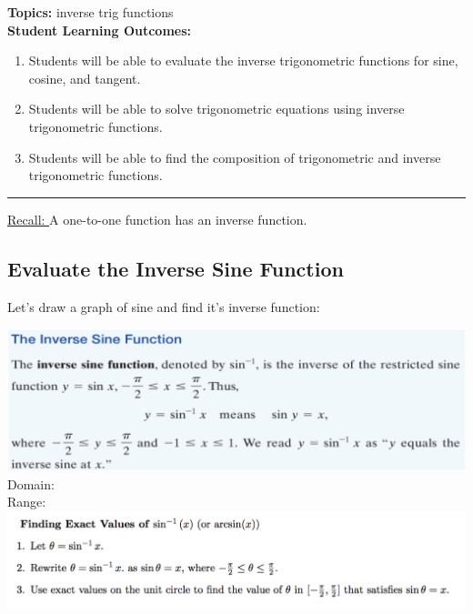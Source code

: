 
\noindent \textbf{Topics:}  inverse trig functions\\

\noindent \textbf{Student Learning Outcomes:}
\begin{enumerate}
\item Students will be able to evaluate the inverse trigonometric functions for sine, cosine, and tangent.
\item Students will be able to solve trigonometric equations using inverse trigonometric functions.
\item Students will be able to find the composition of trigonometric and inverse trigonometric functions.
\end{enumerate}

\hrule 

\bigskip

\noindent \underline{Recall:  } A one-to-one function has an inverse function.
\subsection{Evaluate the Inverse Sine Function}

Let's draw a graph of sine and find it's inverse function:
\vfill

\includegraphics[scale=.7]{sineinverse}\\
\noindent Domain:\\[.5in]
\noindent Range:\\

\newpage
\includegraphics[scale=.7]{findingsineinverse}\\




